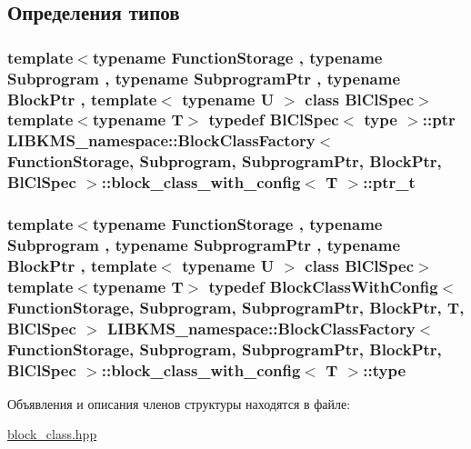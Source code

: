 \subsection{Определения типов}
\hypertarget{structLIBKMS__namespace_1_1BlockClassFactory_1_1block__class__with__config_aefd1235b6ca3cf84ea61f772ae4d50e1}{
\subsubsection[{ptr\-\_\-t}]{\setlength{\rightskip}{0pt plus 5cm}template$<$typename Function\-Storage , typename Subprogram , typename Subprogram\-Ptr , typename Block\-Ptr , template$<$ typename U $>$ class Bl\-Cl\-Spec$>$ template$<$typename T$>$ typedef Bl\-Cl\-Spec$<$ {\bf type} $>$\-::ptr {\bf L\-I\-B\-K\-M\-S\-\_\-namespace\-::\-Block\-Class\-Factory}$<$ {\bf Function\-Storage}, {\bf Subprogram}, Subprogram\-Ptr, Block\-Ptr, Bl\-Cl\-Spec $>$\-::{\bf block\-\_\-class\-\_\-with\-\_\-config}$<$ T $>$\-::{\bf ptr\-\_\-t}}}\label{structLIBKMS__namespace_1_1BlockClassFactory_1_1block__class__with__config_aefd1235b6ca3cf84ea61f772ae4d50e1}
\hypertarget{structLIBKMS__namespace_1_1BlockClassFactory_1_1block__class__with__config_a956d434fd3184b2a9a7c37e3a2421a81}{
\subsubsection[{type}]{\setlength{\rightskip}{0pt plus 5cm}template$<$typename Function\-Storage , typename Subprogram , typename Subprogram\-Ptr , typename Block\-Ptr , template$<$ typename U $>$ class Bl\-Cl\-Spec$>$ template$<$typename T$>$ typedef {\bf Block\-Class\-With\-Config}$<$ {\bf Function\-Storage}, {\bf Subprogram}, Subprogram\-Ptr, Block\-Ptr, T, Bl\-Cl\-Spec $>$ {\bf L\-I\-B\-K\-M\-S\-\_\-namespace\-::\-Block\-Class\-Factory}$<$ {\bf Function\-Storage}, {\bf Subprogram}, Subprogram\-Ptr, Block\-Ptr, Bl\-Cl\-Spec $>$\-::{\bf block\-\_\-class\-\_\-with\-\_\-config}$<$ T $>$\-::{\bf type}}}\label{structLIBKMS__namespace_1_1BlockClassFactory_1_1block__class__with__config_a956d434fd3184b2a9a7c37e3a2421a81}


Объявления и описания членов структуры находятся в файле\-:\begin{DoxyCompactItemize}
\item 
\hyperlink{block__class_8hpp}{block\-\_\-class.\-hpp}\end{DoxyCompactItemize}
